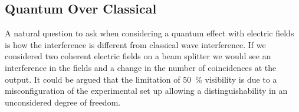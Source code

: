 %
%
%
%

\subsection{Quantum Over Classical}
\label{sec:quant_class}

A natural question to ask when considering a quantum effect with electric fields is how the interference is different from classical wave interference. If we considered two coherent electric fields on a beam splitter we would see an interference in the fields and a change in the number of coincidences at the output. It could be argued that the limitation of \SI{50}{\percent} visibility is due to a misconfiguration of the experimental set up allowing a distinguishability in an unconsidered degree of freedom.

